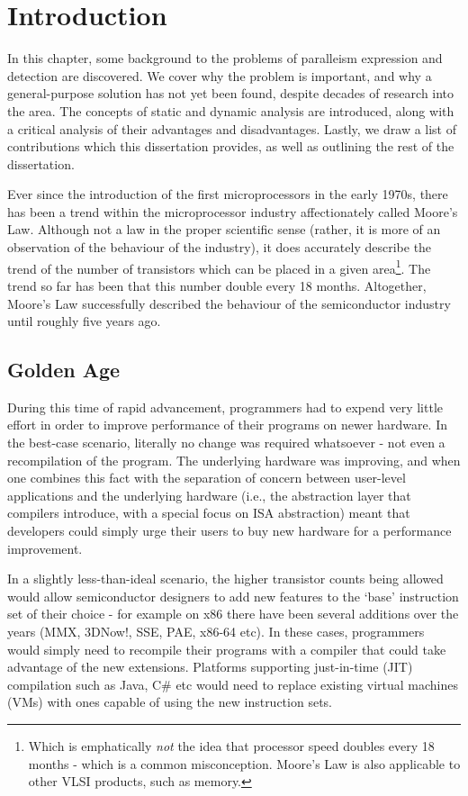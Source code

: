 \chapter{Introduction} \label{chp:introduction}
In this chapter, some background to the problems of paralleism expression and detection are discovered. We cover why the problem is important, and why a general-purpose solution has not yet been found, despite decades of research into the area. The concepts of static and dynamic analysis are introduced, along with a critical analysis of their advantages and disadvantages. Lastly, we draw a list of contributions which this dissertation provides, as well as outlining the rest of the dissertation.

Ever since the introduction of the first microprocessors in the early 1970s, there has been a trend within the microprocessor industry affectionately called Moore's Law. Although not a law in the proper scientific sense (rather, it is more of an observation of the behaviour of the industry), it does accurately describe the trend of the number of transistors which can be placed in a given area\footnote{Which is emphatically \textit{not} the idea that processor speed doubles every 18 months - which is a common misconception. Moore's Law is also applicable to other VLSI products, such as memory.}. The trend so far has been that this number double every 18 months. Altogether, Moore's Law successfully described the behaviour of the semiconductor industry until roughly five years ago.

\section{Golden Age} \label{sec:introduction/golden-age}
During this time of rapid advancement, programmers had to expend very little effort in order to improve performance of their programs on newer hardware. In the best-case scenario, literally no change was required whatsoever - not even a recompilation of the program. The underlying hardware was improving, and when one combines this fact with the separation of concern between user-level applications and the underlying hardware (i.e., the abstraction layer that compilers introduce, with a special focus on ISA abstraction) meant that developers could simply urge their users to buy new hardware for a performance improvement.

In a slightly less-than-ideal scenario, the higher transistor counts being allowed would allow semiconductor designers to add new features to the `base' instruction set of their choice - for example on x86 there have been several additions over the years (MMX, 3DNow!, SSE, PAE, x86-64 etc). In these cases, programmers would simply need to recompile their programs with a compiler that could take advantage of the new extensions. Platforms supporting just-in-time (JIT) compilation such as Java, C\# etc would need to replace existing virtual machines (VMs) with ones capable of using the new instruction sets.

